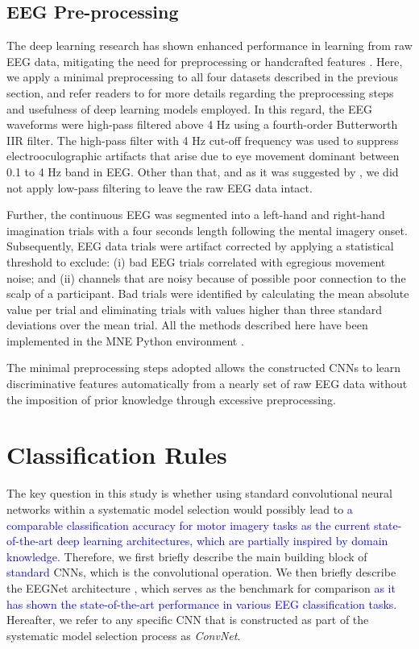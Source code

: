 \documentclass{ieeeaccess}
\begin{document}
\subsection{EEG Pre-processing}
\label{preprocessing}
The deep learning research has shown enhanced performance in learning from raw EEG data, mitigating the need for preprocessing or handcrafted features \cite{Schirrmeister2017, craik2019deep, zhang2019survey}. 
Here, we apply a minimal preprocessing to all four datasets described in the previous section, and refer readers to \cite{lawhern2016eegnet, Schirrmeister2017} for more details regarding the preprocessing steps and usefulness of deep learning models employed. In this regard, the EEG waveforms were high-pass filtered above 4 Hz using a fourth-order Butterworth IIR filter. The high-pass filter with 4 Hz cut-off frequency was used to suppress electrooculographic artifacts that arise due to eye movement dominant between 0.1 to 4 Hz band in EEG. Other than that, and as it was suggested by \cite{Schirrmeister2017}, we did not apply low-pass filtering to leave the raw EEG data intact. 

Further, the continuous EEG was segmented into a left-hand and right-hand imagination trials with a four seconds length following the mental imagery onset. Subsequently, EEG data trials were artifact corrected by applying a statistical threshold to exclude: (i) bad EEG trials correlated with egregious movement noise; and (ii) channels that are noisy because of possible poor connection to the scalp of a participant. Bad trials were identified by calculating the mean absolute value per trial and eliminating trials with values higher than three standard deviations over the mean trial. All the methods described here have been implemented in the MNE Python environment \cite{gramfort2013meg}. 

The minimal preprocessing steps adopted allows the constructed CNNs to learn discriminative features automatically from a nearly set of raw EEG data without the imposition of prior knowledge through excessive preprocessing.
    
    \section{Classification Rules}
    \label{classificationrules}
{The key question in this study is whether using standard convolutional neural networks within a systematic model selection would possibly lead to \textcolor{blue}{a comparable classification accuracy for motor imagery tasks as the current state-of-the-art deep learning architectures, which are partially inspired by domain knowledge.}  Therefore, we first briefly describe the main building block of \textcolor{blue}{standard} CNNs, which is the convolutional operation. We then briefly describe the EEGNet architecture \cite{lawhern2016eegnet}, which serves as the benchmark for comparison \textcolor{blue}{ as it has shown the state-of-the-art performance in various EEG classification tasks.} Hereafter, we refer to any specific CNN that is constructed as part of the systematic model selection process as \textit{ConvNet}. } 
    
\end{document}
